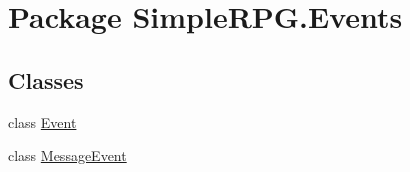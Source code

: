 \hypertarget{namespace_simple_r_p_g_1_1_events}{\section{Package Simple\-R\-P\-G.\-Events}
\label{namespace_simple_r_p_g_1_1_events}
}
\subsection*{Classes}
\begin{DoxyCompactItemize}
\item 
class \hyperlink{class_simple_r_p_g_1_1_events_1_1_event}{Event}
\item 
class \hyperlink{class_simple_r_p_g_1_1_events_1_1_message_event}{Message\-Event}
\end{DoxyCompactItemize}
